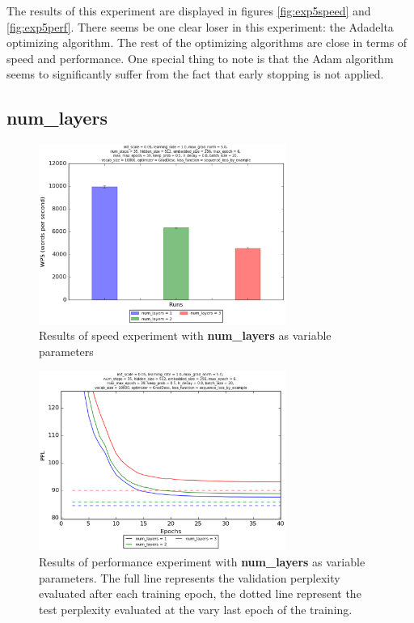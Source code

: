 \documentclass[10pt,a4paper,titlepage]{article}
\begin{document}
The results of this experiment are displayed in figures \ref{fig:exp5speed} and \ref{fig:exp5perf}. There seems be one clear loser in this experiment: the Adadelta optimizing algorithm. The rest of the optimizing algorithms are close in terms of speed and performance. One special thing to note is that the Adam algorithm seems to significantly suffer from the fact that early stopping is not applied.

\subsection{num\_layers}

\begin{figure}[H]
	\begin{center}
		\includegraphics[width=0.72\textwidth]{layersspeed.eps}
		\caption{Results of speed experiment with \textbf{num\_layers} as variable parameters}
		\label{fig:exp6speed}
	\end{center}	
\end{figure}

\begin{figure}[H]
	\begin{center}
		\includegraphics[width=0.72\textwidth]{layersperf.eps}
		\caption{Results of performance experiment with \textbf{num\_layers} as variable parameters. The full line represents the validation perplexity evaluated after each training epoch, the dotted line represent the test perplexity evaluated at the vary last epoch of the training.}
		\label{fig:exp6perf}
	\end{center}	
\end{figure}
\end{document}
